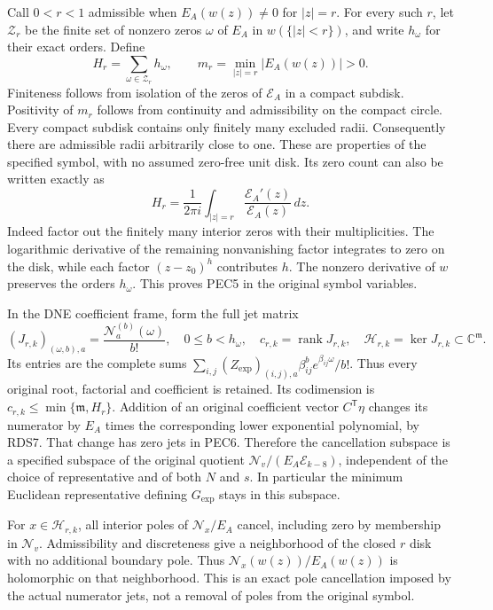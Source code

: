 \documentclass[11pt,a4paper]{article}
\begin{document}
Call $0<r<1$ admissible when $E_A(w(z))\ne0$ for $|z|=r$.
For every such $r$, let $\mathcal Z_r$ be the finite set of nonzero
zeros $\omega$ of $E_A$ in $w(\{|z|<r\})$, and write $h_\omega$
for their exact orders. Define
\[
 H_r=\sum_{\omega\in\mathcal Z_r}h_\omega,
 \qquad m_r=\min_{|z|=r}|E_A(w(z))|>0.
 \tag{PEC4}
\]
Finiteness follows from isolation of the zeros of $\mathcal E_A$
in a compact subdisk. Positivity of $m_r$ follows from continuity
and admissibility on the compact circle. Every compact subdisk contains
only finitely many excluded radii. Consequently there are admissible
radii arbitrarily close to one. These are properties of the specified
symbol, with no assumed zero-free unit disk. Its zero count can also
be written exactly as
\[
 H_r=\frac1{2\pi i}\int_{|z|=r}
             \frac{\mathcal E_A'(z)}{\mathcal E_A(z)}\,dz .
 \tag{PEC5}
\]
Indeed factor out the finitely many interior zeros with their
multiplicities. The logarithmic derivative of the remaining nonvanishing
factor integrates to zero on the disk, while each factor $(z-z_0)^h$
contributes $h$. The nonzero derivative of $w$ preserves the orders
$h_\omega$. This proves PEC5 in the original symbol variables.

In the DNE coefficient frame, form the full jet matrix
\[
 (J_{r,k})_{(\omega,b),a}
   =\frac{\mathcal N_a^{(b)}(\omega)}{b!},
 \quad 0\le b<h_\omega,\quad
 c_{r,k}=\operatorname{rank}J_{r,k},\quad
 \mathcal H_{r,k}=\ker J_{r,k}\subset\mathbb C^{\mathfrak m}.
 \tag{PEC6}
\]
Its entries are the complete sums
$\sum_{i,j}(Z_{\exp})_{(i,j),a}\beta_{ij}^{b}
e^{\beta_{ij}\omega}/b!$. Thus every original root, factorial and
coefficient is retained. Its codimension is $c_{r,k}\le
\min\{\mathfrak m,H_r\}$. Addition of an original coefficient vector
$C^{\mathsf T}\eta$ changes its numerator by $E_A$ times the
corresponding lower exponential polynomial, by RDS7. That change has
zero jets in PEC6. Therefore the cancellation subspace is a specified
subspace of the original quotient
$\mathscr N_v/(E_A\mathscr E_{k-8})$, independent of the choice of
representative and of both $N$ and $s$. In particular the minimum
Euclidean representative defining $G_{\exp}$ stays in this subspace.

For $x\in\mathcal H_{r,k}$, all interior poles of
$\mathcal N_x/E_A$ cancel, including zero by membership in $\mathscr N_v$.
Admissibility and discreteness give a neighborhood of the closed $r$
disk with no additional boundary pole. Thus
$\mathcal N_x(w(z))/E_A(w(z))$ is holomorphic on that neighborhood.
This is an exact pole cancellation imposed by the actual numerator
jets, not a removal of poles from the original symbol.
\end{document}
